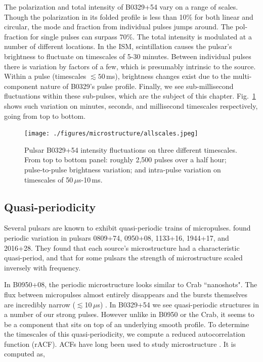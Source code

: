 The polarization and 
total intensity of B0329+54 vary on a range of scales. 
Though the polarization in its folded profile is less than 
10$\%$ for both linear and circular, the 
mode and fraction from individual pulses 
jumps around. The pol-fraction for single pulses 
can surpass $70\%$. The total intensity is modulated 
at a number of different locations.
In the ISM, scintillation causes the pulsar's brightness to fluctuate 
on timescales of 5-30 minutes. Between individual pulses there is  
variation by factors of a few, which is presumably intrinsic 
to the source. Within a pulse (timescales $\lesssim 50$\,ms), 
brightness changes exist due to the multi-component nature 
of B0329's pulse profile. Finally, 
we see sub-millisecond fluctuations within these sub-pulses, 
which are the subject of this chapter.
Fig.~\ref{fig-alltscales} shows such variation on 
minutes, seconds, and millisecond timescales respectively,
going from top to bottom.

\begin{figure}[!h]
\begin{center}
\texttt{[image: ./figures/microstructure/allscales.jpeg]}
\caption{Pulsar B0329+54 intensity fluctuations 
on three different timescales. From top to bottom panel: roughly 
2,500 pulses over a half hour; pulse-to-pulse brightness 
variation; and intra-pulse variation on timescales of 50\,$\mu$s-10\,ms.}
\vspace{-0.75cm}   
\label{fig-alltscales}
\end{center}
\end{figure} 

\subsection{Quasi-periodicity}

Several pulsars are known to exhibit quasi-periodic 
trains of micropulses. \citet{1990AJ....100.1882C} 
found periodic variation in pulsars 0809+74, 0950+08, 
1133+16, 1944+17, and 2016+28. They found that each 
source's microstructure had a characteristic quasi-period, 
and that for some pulsars the strength of microstructure 
scaled inversely with frequency. 

In B0950+08, the periodic microstructure 
looks similar to Crab ``nanoshots".
The flux between micropulses almost entirely disappears 
and the bursts themselves are incredibly narrow ($\lesssim$10\,$\mu$s)
\citep{2002ARep...46..206P}. 
In B0329+54 we see quasi-periodic structures in a 
number of our strong pulses. However unlike in B0950 or 
the Crab, it seems to be a component that sits on 
top of an underlying smooth profile. To determine the 
timescales of this quasi-periodicity, we compute 
a reduced autocorrelation function (rACF). ACFs
have long been used to study microstructure
\citep[see][]{1978AZh....55.1024K, 1998A&A...332..111L}. 
It is computed as,

